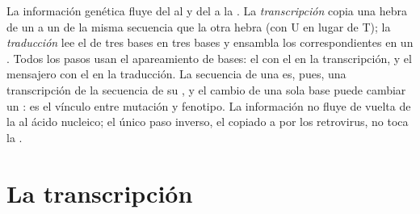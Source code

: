 \begin{proposition}\label{prop:b1:gene-expression:dogma}
La información genética fluye del  al  y del  a la . La
\emph{transcripción} copia una hebra de un  a un  de la misma
secuencia que la otra hebra (con U en lugar de T); la \emph{traducción} lee
el  de tres bases en tres bases y ensambla los 
correspondientes en un . Todos los pasos usan el apareamiento de
bases: el  con el  en la transcripción, y el mensajero con el  en la traducción. La secuencia de una  es, pues, una
transcripción de la secuencia de su , y el cambio de una sola base puede
cambiar un : es el vínculo entre mutación y fenotipo. La
información no fluye de vuelta de la  al ácido nucleico; el único
paso inverso, el  copiado a  por los retrovirus, no toca la .
\end{proposition}

\section{La transcripción}

